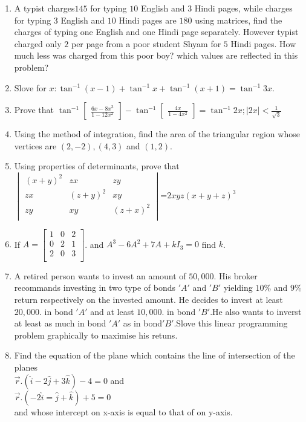 \documentclass[12pt,-letter paper]{article}
\providecommand{\mydet}[1]{\ensuremath{\begin{vmatrix}#1\end{vmatrix}}}
\providecommand{\myvec}[1]{\ensuremath{\begin{bmatrix}#1\end{bmatrix}}}
\providecommand{\brak}[1]{\ensuremath{\left(#1\right)}}
\begin{document}
\begin{enumerate}
 \item A typist charges\rupee$145$ for typing $10$ English and $3$ Hindi pages, while charges for typing $3$ English and $10$ Hindi pages are \rupee$180$ using matrices, find the charges of typing one English and one Hindi page separately. However typist charged only \rupee$2$  per page from a poor student Shyam for $5$ Hindi pages. How much less was charged from this poor boy? which values are reflected in this problem?

 \item Slove for $x:\tan^{-1}\brak{x-1}+\tan^{-1}x+\tan^{-1}\brak{x+1}=\tan^{-1}3x$.



 \item Prove that $\tan^{-1}\myvec{\frac{6x-8x^3}{1-12x^2}}-\tan^{-1}\myvec{\frac{4x}{1-4x^2}}=\tan^{-1}2x;|2x|<\frac{1}{\sqrt{3}}$



 \item Using the method of integration, find the area of the triangular region whose vertices are $\brak{2,-2}, \brak{4,3}$ and $\brak{1,2}$.
   
 \item Using properties of determinants, prove that $\mydet{ \brak{x+y}^{2} & zx &  zy\\ zx & \brak{z+y}^{2} & xy\\ zy & xy & \brak{z+x}^{2}\\}$=$2xyz\brak{x+y+z}^{3}$





\item  If $A=\myvec{1 & 0 & 2 \\
	           0  & 2 & 1 \\
	            2 & 0 & 3 \\}$. and $A^3-6A^2+7A+kI_3=0$  find $k$.



  \item A retired person wants to invest an amount of \rupee$50,000$. His broker recommands investing in two type of bonds $'A'$ and $'B'$ yielding $10\%$ and $9\%$ return respectively on the invested amount. He decides to invest at least\rupee$20,000$. in bond $'A'$ and at least \rupee$10,000$. in bond $'B'$.He also wants to inverst at least as much in bond $'A'$ as in bond$'B'$.Slove this linear programming problem graphically to maximise his retuns.


  \item Find the equation of the plane which contains the line of intersection of the planes\\
	  $\overset{\rightarrow}{r}.\brak{\hat{i}-2\hat{j}+3\hat{k}}-4=0$ and \\ $\overset{\rightarrow}{r}.\brak{-2\hat{i}=\hat{j}+\hat{k}}+5=0$\\ and whose intercept on x-axis is equal to that of on y-axis.
    


\end{enumerate}
\end{document}
